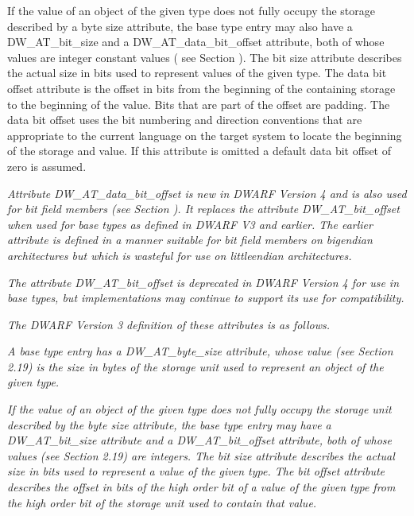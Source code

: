 If the value of an object of the given type does not fully
occupy the storage described by a byte size attribute,
the base type entry may also have a DW\_AT\_bit\_size and a
DW\_AT\_data\_bit\_offset attribute, both of whose values are
integer constant values (
see Section ). 
The bit size
attribute describes the actual size in bits used to represent
values of the given type. The data bit offset attribute is the
offset in bits from the beginning of the containing storage to
the beginning of the value. Bits that are part of the offset
are padding. The data bit offset uses the bit numbering and
direction conventions that are appropriate to the current
language on the
target system to locate the beginning of the storage and
value. If this attribute is omitted a default data bit offset
of zero is assumed.

\textit{Attribute DW\_AT\_data\_bit\_offset is new in DWARF Version 4 and
is also used for bit field members 
(see Section ). 
It
replaces the attribute DW\_AT\_bit\_offset when used for base
types as defined in DWARF V3 and earlier. The earlier attribute
is defined in a manner suitable for bit field members on
big\dash endian architectures but which is wasteful for use on
little\dash endian architectures.}

\textit{The attribute DW\_AT\_bit\_offset is deprecated in DWARF Version
4 for use in base types, but implementations may continue to
support its use for compatibility.}

\textit{The DWARF Version 3 definition of these attributes is as follows.}

\begin{myindentpara}{1cm}
\textit{A base type entry has a DW\_AT\_byte\_size attribute, whose value
(see Section 2.19) is the size in bytes of the storage unit
used to represent an object of the given type.}

\textit{If the value of an object of the given type does not fully
occupy the storage unit described by the byte size attribute,
the base type entry may have a DW\_AT\_bit\_size attribute and a
DW\_AT\_bit\_offset attribute, both of whose values (see Section
2.19) are integers. The bit size attribute describes the actual
size in bits used to represent a value of the given type.
The bit offset attribute describes the offset in bits of the
high order bit of a value of the given type from the high
order bit of the storage unit used to contain that value.}
\end{myindentpara}

